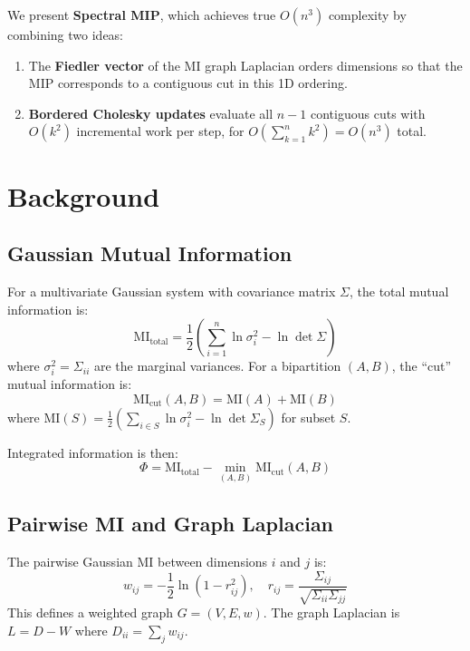 \documentclass[10pt,letterpaper]{article}
\begin{document}
We present \textbf{Spectral MIP}, which achieves true $O(n^3)$ complexity by combining two ideas:
\begin{enumerate}[nosep]
  \item The \textbf{Fiedler vector} of the MI graph Laplacian orders dimensions so that the MIP corresponds to a contiguous cut in this 1D ordering.
  \item \textbf{Bordered Cholesky updates} evaluate all $n-1$ contiguous cuts with $O(k^2)$ incremental work per step, for $O(\sum_{k=1}^{n} k^2) = O(n^3)$ total.
\end{enumerate}

\section{Background}

\subsection{Gaussian Mutual Information}

For a multivariate Gaussian system with covariance matrix $\Sigma$, the total mutual information is:
\begin{equation}
  \text{MI}_{\text{total}} = \frac{1}{2}\left(\sum_{i=1}^{n} \ln \sigma_i^2 - \ln \det \Sigma\right)
\end{equation}
where $\sigma_i^2 = \Sigma_{ii}$ are the marginal variances. For a bipartition $(A, B)$, the ``cut'' mutual information is:
\begin{equation}
  \text{MI}_{\text{cut}}(A, B) = \text{MI}(A) + \text{MI}(B)
\end{equation}
where $\text{MI}(S) = \frac{1}{2}(\sum_{i \in S} \ln \sigma_i^2 - \ln \det \Sigma_S)$ for subset $S$.

Integrated information is then:
\begin{equation}
  \Phi = \text{MI}_{\text{total}} - \min_{(A,B)} \text{MI}_{\text{cut}}(A, B)
\end{equation}

\subsection{Pairwise MI and Graph Laplacian}

The pairwise Gaussian MI between dimensions $i$ and $j$ is:
\begin{equation}
  w_{ij} = -\frac{1}{2} \ln(1 - r_{ij}^2), \quad r_{ij} = \frac{\Sigma_{ij}}{\sqrt{\Sigma_{ii}\Sigma_{jj}}}
\end{equation}
This defines a weighted graph $G = (V, E, w)$. The graph Laplacian is $L = D - W$ where $D_{ii} = \sum_j w_{ij}$.
\end{document}
